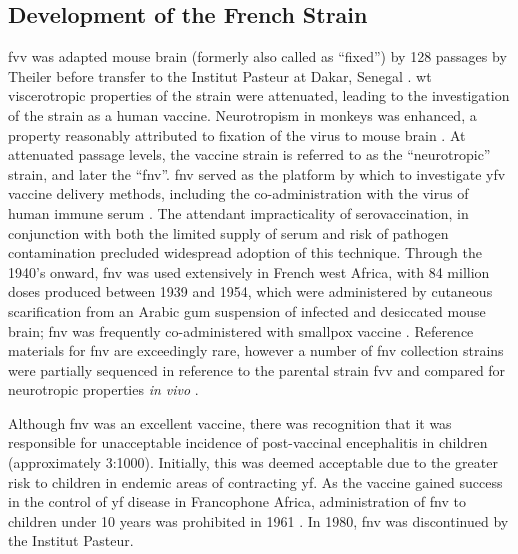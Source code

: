\subsection{Development of the French Strain}
\Gls{fvv} was adapted mouse brain (formerly also called as “fixed”) by 128 passages by Theiler before transfer to the Institut Pasteur at Dakar, Senegal \parencite{Theiler:1930gy,Durieux:1956wx}. \Gls{wt} viscerotropic properties of the strain were attenuated, leading to the investigation of the strain as a human vaccine. Neurotropism in monkeys was enhanced, a property reasonably attributed to fixation of the virus to mouse brain \parencite{Lloyd:1933wv,Ni:2000un}. At attenuated passage levels, the vaccine strain is referred to as the “neurotropic” strain, and later the “\gls{fnv}”. \Gls{fnv} served as the platform by which to investigate \gls{yfv} vaccine delivery methods, including the co-administration with the virus of human immune serum \parencite{Sawyer:1932vb}. The attendant impracticality of serovaccination, in conjunction with both the limited supply of serum and risk of pathogen contamination precluded widespread adoption of this technique. Through the 1940’s onward, \gls{fnv} was used extensively in French west Africa, with 84 million doses produced between 1939 and 1954, which were administered by cutaneous scarification from an Arabic gum suspension of infected and desiccated mouse brain; \gls{fnv} was frequently co-administered with smallpox vaccine \parencite{Durieux:1956wx}. Reference materials for \gls{fnv} are exceedingly rare, however a number of \gls{fnv} collection strains were partially sequenced in reference to the parental strain \gls{fvv} and compared for neurotropic properties \emph{in vivo} \parencite{Wang:1995vu}.

Although \gls{fnv} was an excellent vaccine, there was recognition that it was responsible for unacceptable incidence of post-vaccinal encephalitis in children (approximately 3:1000)\parencite{STONES:1955uj}. Initially, this was deemed acceptable due to the greater risk to children in endemic areas of contracting \gls{yf}. As the vaccine gained success in the control of \gls{yf} disease in Francophone Africa, administration of \gls{fnv} to children under 10 years was prohibited in 1961 \parencite{Vainio:1998wy}. In 1980, \gls{fnv} was discontinued by the Institut Pasteur. 

